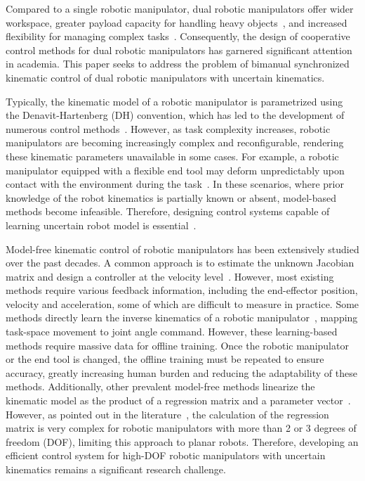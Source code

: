 \documentclass[journal,twoside,web]{ieeecolor}
\begin{document}
Compared to a single robotic manipulator, dual robotic manipulators offer wider workspace, greater payload capacity for handling heavy objects~\cite{Caccavale2008}, and increased flexibility for managing complex tasks~\cite{Jin2023TII}. Consequently, the design of cooperative control methods for dual robotic manipulators has garnered significant attention in academia. This paper seeks to address the problem of bimanual synchronized kinematic control of dual robotic manipulators with uncertain kinematics.

Typically, the kinematic model of a robotic manipulator is parametrized using the Denavit-Hartenberg (DH) convention, which has led to the development of numerous control methods~\cite{Zhang2022}. However, as task complexity increases, robotic manipulators are becoming increasingly complex and reconfigurable, rendering these kinematic parameters unavailable in some cases. For example, a robotic manipulator equipped with a flexible end tool may deform unpredictably upon contact with the environment during the task~\cite{Wang2023}. In these scenarios, where prior knowledge of the robot kinematics is partially known or absent, model-based methods become infeasible. Therefore, designing control systems capable of learning uncertain robot model is essential~\cite{DallaLibera2021}.

Model-free kinematic control of robotic manipulators has been extensively studied over the past decades. A common approach is to estimate the unknown Jacobian matrix and design a controller at the velocity level~\cite{Liu2022b}. However, most existing methods require various feedback information, including the end-effector position, velocity and acceleration, some of which are difficult to measure in practice. Some methods directly learn the inverse kinematics of a robotic manipulator~\cite{Kim2021}, mapping task-space movement to joint angle command. However, these learning-based methods require massive data for offline training. Once the robotic manipulator or the end tool is changed, the offline training must be repeated to ensure accuracy, greatly increasing human burden and reducing the adaptability of these methods. Additionally, other prevalent model-free methods linearize the kinematic model as the product of a regression matrix and a parameter vector~\cite{Wang2017b}. However, as pointed out in the literature~\cite{Tarokh2021}, the calculation of the regression matrix is very complex for robotic manipulators with more than 2 or 3 degrees of freedom (DOF), limiting this approach to planar robots. Therefore, developing an efficient control system for high-DOF robotic manipulators with uncertain kinematics remains a significant research challenge.
\end{document}

